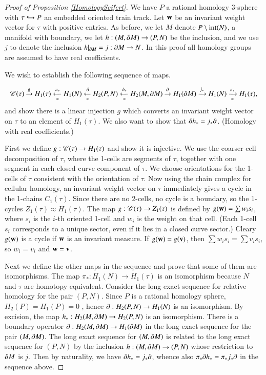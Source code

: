 \documentclass[12pt]{article}
\theoremstyle{remark}
\begin{document}
\begin{proof}[Proof of Proposition \ref{HomologySeifert}]  We have $P$  a rational homology 3-sphere with $\tau\hookrightarrow P$ an embedded oriented train track.  Let ${\bf w}$ be an invariant weight vector for $\tau$ with positive entries.  As before, we let $M$ denote $P\setminus {\rm int}(N)$, a manifold with boundary, we let $h:(M,\partial M)\to (P,N)$ be the inclusion, and we use $j$ to denote the inclusion $h|_{\partial M}=j:\partial M\to N$. In this proof all homology groups are assumed to have real coefficients.
\hop

We wish to establish the following sequence of maps.

$$\mathscr{C}(\tau)\xrightarrow{g} H_1(\tau)\xleftarrow[\approx]{\pi_*} H_1(N)\xleftarrow[\approx]{\partial}H_2(P,N)\xleftarrow[\approx]{h_*} H_2(M,\partial M)\xrightarrow{\partial}H_1(\partial M)\xrightarrow{j_*}H_1(N)\xrightarrow [\approx]{\pi_*}  H_1(\tau) ,$$
and show there is a linear injection $g$ which converts an invariant weight vector on $\tau$ to an element of $H_1(\tau)$.  We also want to show that $\partial h_*=j_*\partial$.  (Homology with real coefficients.)

\hop

First we define $g:\mathscr{C}(\tau)\to H_1(\tau)$ and show it is injective.   We use the coarser cell decomposition of $\tau$, where the 1-cells are segments of $\tau$, together with one segment in each closed curve component of $\tau$.  We choose orientations for the 1-cells of $\tau$ consistent with the orientation of $\tau$.  Now using the chain complex for cellular homology, an invariant weight vector on $\tau$ immediately gives a cycle in the 1-chains $C_1(\tau)$.   Since there are no 2-cells, no cycle is a boundary, so the 1-cycles $Z_1(\tau)\approx H_1(\tau)$.  The map $g:\mathscr{C}(\tau)\to Z_1(\tau)$ is  defined by $g({\bf w})=\sum w_is_i$, where $s_i$ is the $i$-th oriented 1-cell and $w_i$ is the weight on that cell.  (Each 1-cell $s_i$ corresponds to a unique sector, even if it lies in a closed curve sector.)  Cleary $g({\bf w})$ is a cycle if ${\bf w}$ is an invariant measure.
  If $g({\bf w})=g({\bf v})$, then $\sum w_is_i=\sum v_is_i$, so $w_i=v_i$ and ${\bf w}={\bf v}$.  

Next we define the other maps in the sequence and prove that some of them are isomorphisms. The map $\pi_*:H_1(N)\to H_1(\tau)$ is an isomorphism because $N$ and $\tau$ are homotopy equivalent.  Consider the long exact sequence for relative homology for the pair $(P,N)$.  Since $P$ is a rational homology sphere, $H_2(P)=H_1(P)=0$ , hence $\partial:H_2(P,N)\to H_1(N)$ is an isomorphism.  By excision, the map $h_*:H_2(M,\partial M)\to H_2(P,N)$ is an isomorphism.  There is a boundary operator $\partial:H_2(M,\partial M)\to H_1(\partial M)$ in the long exact sequence for the pair $(M,\partial M)$.   The long exact sequence for $(M,\partial M)$ is related to the long exact sequence for $(P,N)$ by the inclusion $h:(M,\partial M)\to (P,N)$ whose restriction to $\partial M$ is $j$.   Then by naturality, we have $\partial h_*=j_*\partial$, whence also $\pi_*\partial h_*=\pi_*j_*\partial$ in the sequence above.


\end{proof}
\end{document}
